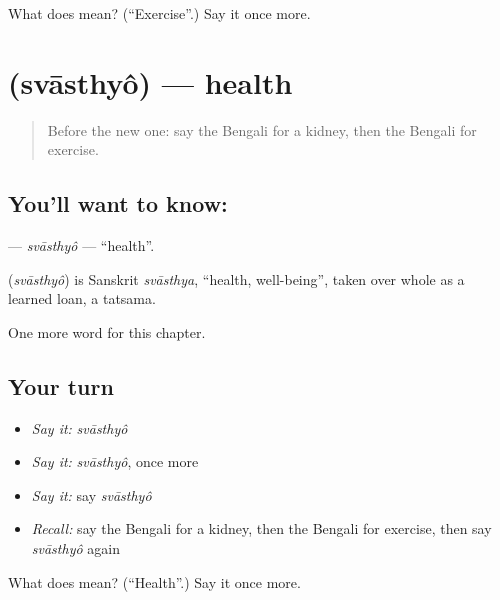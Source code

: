 \begin{tcolorbox}[breakable,colback=teal!4,colframe=teal!35!black,title={Before you move on}]
What does  mean? (\textquotedblleft{}Exercise\textquotedblright{}.) Say it once more.
\end{tcolorbox}
\section[\texorpdfstring{\bn{স্বাস্থ্য} (svāsthyô)}{স্বাস্থ্য (svāsthyô)}]{ (svāsthyô) — health}

\label{lesson:BN-C155-svasthyo}



\begin{quote}
Before the new one: say the Bengali for a kidney, then the Bengali for exercise.
\end{quote}

\subsection*{You'll want to know: }
\textbf{} — \emph{svāsthyô} — \textquotedblleft{}health\textquotedblright{}.

\begin{cousinweb}
\textbf{} (\emph{svāsthyô}) is Sanskrit \emph{svāsthya}, \textquotedblleft{}health, well-being\textquotedblright{}, taken over whole as a learned loan, a tatsama.
\end{cousinweb}

\begin{grammarlens}[title={What you've built}]
One more word for this chapter.
\end{grammarlens}

\subsection*{Your turn}
\begin{itemize}
\raggedright
  \item \emph{Say it:} \emph{svāsthyô}
  \item \emph{Say it:} \emph{svāsthyô}, once more
  \item \emph{Say it:} say \emph{svāsthyô}
  \item \emph{Recall:} say the Bengali for a kidney, then the Bengali for exercise, then say \emph{svāsthyô} again
\end{itemize}

\begin{tcolorbox}[breakable,colback=teal!4,colframe=teal!35!black,title={Before you move on}]
What does  mean? (\textquotedblleft{}Health\textquotedblright{}.) Say it once more.
\end{tcolorbox}
